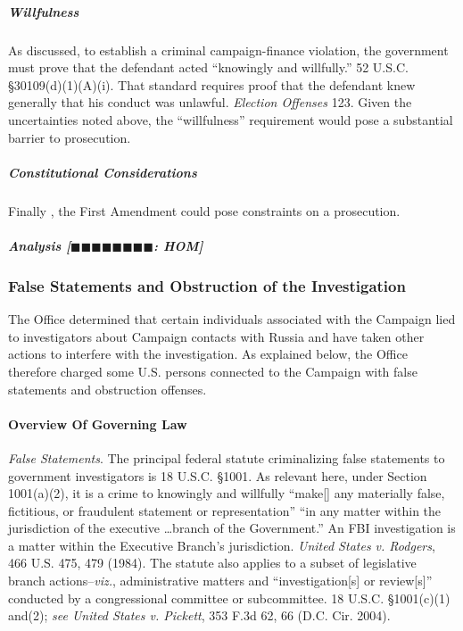 \subparagraph{Willfulness}
As discussed, to establish a criminal campaign-finance violation, the government must prove that the defendant acted ``knowingly and willfully.''
52 U.S.C. \S 30109(d)(1)(A)(i).
That standard requires proof that the defendant knew generally that his conduct was unlawful.
\textit{Election Offenses} 123.
Given the uncertainties noted above, the ``willfulness'' requirement would pose a substantial barrier to prosecution.

\subparagraph{Constitutional Considerations}
Finally , the First Amendment could pose constraints on a prosecution.

\subparagraph{Analysis [$\blacksquare\blacksquare\blacksquare\blacksquare\blacksquare\blacksquare\blacksquare\blacksquare$: HOM]}



\subsubsection{False Statements and Obstruction of the Investigation}
The Office determined that certain individuals associated with the Campaign lied to investigators about Campaign contacts with Russia and have taken other actions to interfere with the investigation.
As explained below, the Office therefore charged some U.S. persons connected to the Campaign with false statements and obstruction offenses.

\paragraph{Overview Of Governing Law}
\textit{False Statements}.
The principal federal statute criminalizing false statements to government investigators is 18 U.S.C. \S 1001.
As relevant here, under Section 1001(a)(2), it is a crime to knowingly and willfully ``make[] any materially false, fictitious, or fraudulent statement or representation'' ``in any matter within the jurisdiction of the executive \dots branch of the Government.''
An FBI investigation is a matter within the Executive Branch's jurisdiction.
\textit{United States v. Rodgers}, 466 U.S. 475, 479 (1984).
The statute also applies to a subset of legislative branch actions--\textit{viz.}, administrative matters and ``investigation[s] or review[s]'' conducted by a congressional committee or subcommittee.
18 U.S.C. \S 1001(c)(1) and(2); \textit{see United States v. Pickett}, 353 F.3d 62, 66 (D.C. Cir. 2004).

